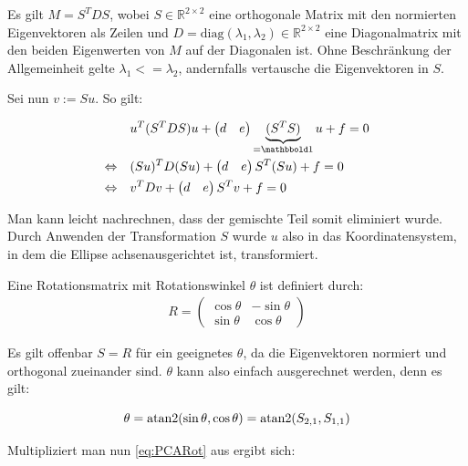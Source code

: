 Es gilt $M = S^TDS$, wobei $S\in\mathbb{R}^{2\times2}$ eine orthogonale Matrix mit den normierten Eigenvektoren als Zeilen und $D = \text{diag}(\lambda_1, \lambda_2)\in\mathbb{R}^{2\times2}$ eine Diagonalmatrix mit den beiden Eigenwerten von $M$ auf der Diagonalen ist. Ohne Beschränkung der Allgemeinheit gelte $\lambda_1 <= \lambda_2$, andernfalls vertausche die Eigenvektoren in $S$. 

Sei nun $v := Su$.
So gilt:

\begin{equation} \label{eq:PCARot}
\begin{aligned}
&u^T(S^TDS)u +\begin{pmatrix}d & e\end{pmatrix}\underbrace{(S^TS)}_{=\ind}u + f = 0 \\
\Leftrightarrow\quad &(Su)^TD(Su) +\begin{pmatrix}d & e\end{pmatrix}S^T(Su) + f = 0 \\
\Leftrightarrow\quad &v^{T}Dv +\begin{pmatrix}d & e\end{pmatrix}S^Tv + f = 0 
\end{aligned}
\end{equation}

Man kann leicht nachrechnen, dass der gemischte Teil somit eliminiert wurde. Durch Anwenden der Transformation $S$ wurde $u$ also in das Koordinatensystem, in dem die Ellipse achsenausgerichtet ist,  transformiert.

Eine Rotationsmatrix mit Rotationswinkel $\theta$ ist definiert durch: 
\begin{equation}
\begin{aligned}
R = \begin{pmatrix}\cos\theta & -\sin\theta \\ \sin\theta & \cos\theta\end{pmatrix}
\end{aligned}
\end{equation}

Es gilt offenbar $S = R$ für ein geeignetes $\theta$, da die Eigenvektoren normiert und orthogonal zueinander sind. $\theta$ kann also einfach ausgerechnet werden, denn es gilt:

\begin{equation*}
\theta = \text{atan2}(\sin\theta, \cos\theta) = \text{atan2}(S_{2,1}, S_{1,1})
\end{equation*}

Multipliziert man nun \ref{eq:PCARot} aus ergibt sich:

